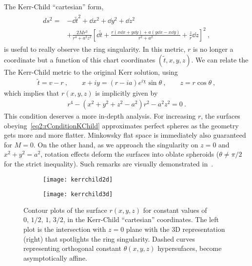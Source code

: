 The Kerr-Child ``cartesian'' form, 
\begin{align}
    \begin{split}
        ds^2 = &- \dd \tilde{t}^2 + \dd x^2 + \dd y^2 + \dd z^2 \\
        &+ \frac{2 M r^3}{r^4 + a^2 z^2} \left[ \dd \tilde{t} + \frac{r (x \dd x + y \dd y) + a ( y \dd x - x \dd y)}{r^2+a^2} + \frac{z}{r} \dd z \right]^2 ~,
    \end{split}
    \label{eq2:KerrChild}
\end{align}
is useful to really observe the ring singularity.
In this metric, $r$ is no longer a coordinate but a function of this chart coordinates $(\tilde{t},x,y,z)$.
We can relate the The Kerr-Child metric to the original Kerr solution, using
\begin{align}
    \tilde{t} = v - r ~, \qquad x+ i y = (r -i a) e^{i \chi} \sin\theta ~,\qquad z=r\cos\theta ~,
    \label{eq2:InEFtoKChild}
\end{align}
which implies that $r(x,y,z)$ is implicitly given by
\begin{align}
    r^4 - (x^2+y^2+z^2-a^2)r^2 -a^2 z^2 = 0 ~.
    \label{eq2:rConditionKChild}
\end{align}
This condition deserves a more in-depth analysis.
For increasing $r$, the surfaces obeying~\eqref{eq2:rConditionKChild} approximates perfect spheres as the geometry gets more and more flatter. Minkowsky flat space is immediately also guaranteed for $M=0$.
On the other hand, as we approach the singularity on $z=0$ and $x^2+y^2 = a^2$, rotation effects deform the surfaces into oblate spheroids ($\theta\ne\pi/2$ for the strict inequality).
Such remarks are visually demonstrated in~.

\begin{figure}[h]
    \centering
    \begin{subfigure}[c]{0.45\textwidth}
        \texttt{[image: kerrchild2d]}
    \end{subfigure}
    \hspace{1cm}
    \begin{subfigure}[c]{0.35\textwidth}
        \texttt{[image: kerrchild3d]}
    \end{subfigure}
    \caption{Contour plots of the surface $r(x,y,z)$ for constant values of $0,\,1/2,\,1,\,3/2$, in the Kerr-Child ``cartesian'' coordinates. The left plot is the intersection with $z=0$ plane with the 3D representation (right) that spotlights the ring singularity. Dashed curves representing orthogonal constant $\theta(x,y,z)$ hypersufaces, become asymptotically affine.}\label{fig2:kerrchild}
\end{figure}

